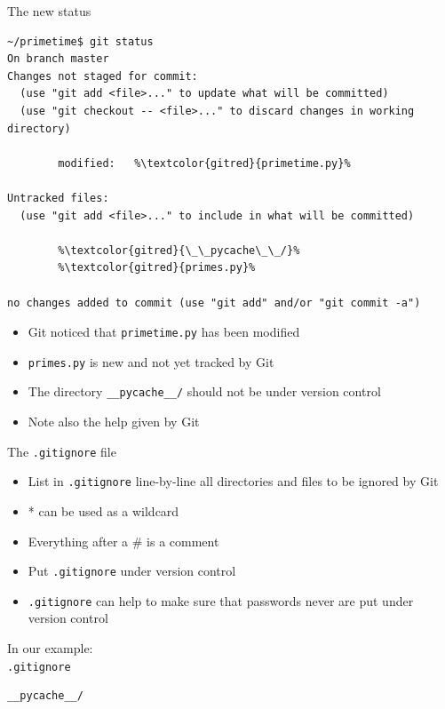 \documentclass[svgnames]{beamer}
\begin{document}
\begin{frame}[fragile]{The new status}
 \addtolength\linewidth{0.5truecm}
 \begin{lstlisting}[breaklines=true, escapechar=\%]
~/primetime$ git status
On branch master
Changes not staged for commit:
  (use "git add <file>..." to update what will be committed)
  (use "git checkout -- <file>..." to discard changes in working directory)

        modified:   %\textcolor{gitred}{primetime.py}%

Untracked files:
  (use "git add <file>..." to include in what will be committed)

        %\textcolor{gitred}{\_\_pycache\_\_/}%
        %\textcolor{gitred}{primes.py}%

no changes added to commit (use "git add" and/or "git commit -a")
 \end{lstlisting}
 \begin{itemize}
  \item Git noticed that \texttt{primetime.py} has been modified
  \item \texttt{primes.py} is new and not yet tracked by Git
  \item The directory \texttt{\_\_pycache\_\_/} should not be under version control
  \item Note also the help given by Git
 \end{itemize}
\end{frame}

\begin{frame}[fragile]{The \texttt{.gitignore} file}
 \begin{itemize}
  \item List in \texttt{.gitignore} line-by-line all directories and files to
	be ignored by Git
  \item * can be used as a wildcard
  \item Everything after a \# is a comment
  \item Put \texttt{.gitignore} under version control
  \item \texttt{.gitignore} can help to make sure that passwords never are put
	under version control
 \end{itemize}

 \vspace{0.3truecm}
 In our example:\\
 \texttt{.gitignore}
 \begin{lstlisting}
__pycache__/
 \end{lstlisting}
\end{frame}
\end{document}
